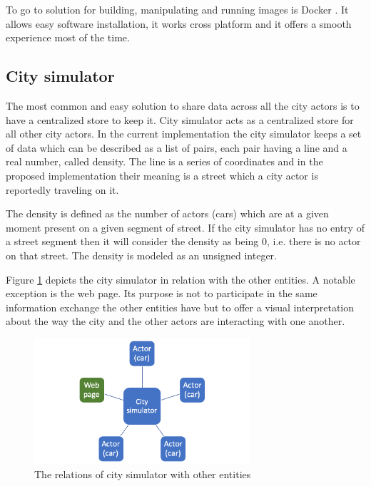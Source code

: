 \documentclass[conference]{IEEEtran}
\begin{document}
To go to solution for building, manipulating and running images is Docker \citep{docker}. It allows easy software installation, it works cross platform and it offers a smooth experience most of the time.

\subsection{City simulator}
\label{subsection:citysimulator}

The most common and easy solution to share data across all the city actors is to have a centralized store to keep it. City simulator acts as a centralized store for all other city actors. In the current implementation the city simulator keeps a set of data which can be described as a list of pairs, each pair having a line and a real number, called density. The line is a series of coordinates and in the proposed implementation their meaning is a street which a city actor is reportedly traveling on it.

The density is defined as the number of actors (cars) which are at a given moment present on a given segment of street. If the city simulator has no entry of a street segment then it will consider the density as being 0, i.e. there is no actor on that street. The density is modeled as an unsigned integer.

Figure \ref{fig:citysimrelations} depicts the city simulator in relation with the other entities. A notable exception is the web page. Its purpose is not to participate in the same information exchange the other entities have but to offer a visual interpretation about the way the city and the other actors are interacting with one another.

\begin{figure}
    \includegraphics[width=8cm]{CitySimulator.png}
    \centering
    \caption{The relations of city simulator with other entities}
    \label{fig:citysimrelations}
\end{figure}
\end{document}
